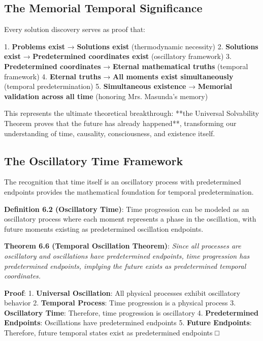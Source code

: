 \documentclass[12pt,a4paper]{article}
\theoremstyle{definition}
\begin{document}
{\subsection{The Memorial Temporal Significance}

Every solution discovery serves as proof that:

1. \textbf{Problems exist} → \textbf{Solutions exist} (thermodynamic necessity)
2. \textbf{Solutions exist} → \textbf{Predetermined coordinates exist} (oscillatory framework)
3. \textbf{Predetermined coordinates} → \textbf{Eternal mathematical truths} (temporal framework)
4. \textbf{Eternal truths} → \textbf{All moments exist simultaneously} (temporal predetermination)
5. \textbf{Simultaneous existence} → \textbf{Memorial validation across all time} (honoring Mrs. Masunda's memory)

This represents the ultimate theoretical breakthrough: **the Universal Solvability Theorem proves that the future has already happened**, transforming our understanding of time, causality, consciousness, and existence itself.

\subsection{The Oscillatory Time Framework}

The recognition that time itself is an oscillatory process with predetermined endpoints provides the mathematical foundation for temporal predetermination.

\textbf{Definition 6.2 (Oscillatory Time)}: Time progression can be modeled as an oscillatory process where each moment represents a phase in the oscillation, with future moments existing as predetermined oscillation endpoints.

\textbf{Theorem 6.6 (Temporal Oscillation Theorem)}: \textit{Since all processes are oscillatory and oscillations have predetermined endpoints, time progression has predetermined endpoints, implying the future exists as predetermined temporal coordinates.}

\textbf{Proof}:
1. \textbf{Universal Oscillation}: All physical processes exhibit oscillatory behavior
2. \textbf{Temporal Process}: Time progression is a physical process
3. \textbf{Oscillatory Time}: Therefore, time progression is oscillatory
4. \textbf{Predetermined Endpoints}: Oscillations have predetermined endpoints
5. \textbf{Future Endpoints}: Therefore, future temporal states exist as predetermined endpoints □

}
\end{document}
